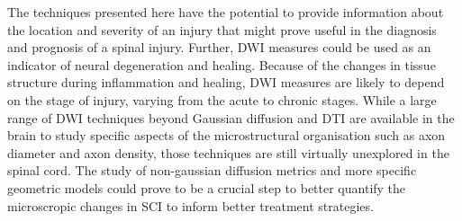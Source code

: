 The techniques presented here have the potential to provide information about the location and severity of an injury that might prove useful in the diagnosis and prognosis of a spinal injury. Further, \gls{DWI} measures could be used as an indicator of neural degeneration and healing.  Because of the changes in tissue structure during inflammation and healing, \gls{DWI} measures are likely to depend on the stage of injury, varying from the acute to chronic stages. While a large range of \gls{DWI} techniques beyond Gaussian diffusion and \gls{DTI} are available in the brain to study specific aspects of the microstructural organisation such as axon diameter and axon density, those techniques are still virtually unexplored in the spinal cord. The study of non-gaussian diffusion metrics and more specific geometric models could prove to be a crucial step to better quantify the microscropic changes in \gls{SCI} to inform better treatment strategies.
 	

